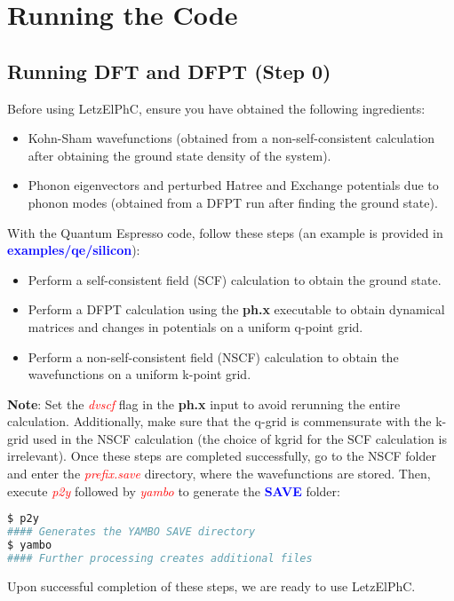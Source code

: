 \documentclass[12pt,twoside,openany]{book}
\begin{document}
\chapter{Running the Code}
\section{Running DFT and DFPT (Step 0)}
Before using LetzElPhC, ensure you have obtained the following ingredients:
\begin{itemize}
\item Kohn-Sham wavefunctions (obtained from a non-self-consistent calculation after obtaining the ground state density of the system).
\item Phonon eigenvectors and perturbed Hatree and Exchange potentials due to phonon modes (obtained from a DFPT run after finding the ground state).
\end{itemize}
With the Quantum Espresso code, follow these steps (an example is provided in \textcolor{blue}{\bf{examples/qe/silicon}}):
\begin{itemize}
\item Perform a self-consistent field (SCF) calculation to obtain the ground state.
\item Perform a DFPT calculation using the \textbf{ph.x} executable to obtain dynamical matrices and changes in potentials on a uniform q-point grid.
\item Perform a non-self-consistent field (NSCF) calculation to obtain the wavefunctions on a uniform k-point grid.
\end{itemize}
\textbf{Note}: Set the \textcolor{red}{\emph{dvscf}} flag in the \textbf{ph.x} input to avoid rerunning the entire calculation. 
Additionally, make sure that the q-grid is commensurate with the k-grid used in the NSCF calculation (the choice of kgrid for the SCF calculation is irrelevant).
Once these steps are completed successfully, go to the NSCF folder and enter the \textcolor{red}{\emph{prefix.save}} directory, 
where the wavefunctions are stored. Then, execute \textcolor{red}{\emph{p2y}} followed by \textcolor{red}{\emph{yambo}} to generate the \textcolor{blue}{\bf{SAVE}} folder:
\begin{lstlisting}[language=bash]
$ p2y
#### Generates the YAMBO SAVE directory
$ yambo
#### Further processing creates additional files
\end{lstlisting}
Upon successful completion of these steps, we are ready to use LetzElPhC.
\end{document}
